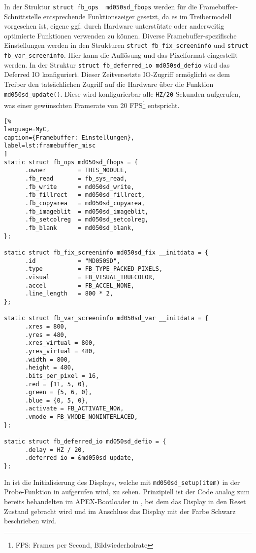 In der Struktur \lstinline|struct fb_ops  md050sd_fbops| werden für die Framebuffer-Schnittstelle entsprechende Funktionszeiger gesetzt, da es im Treibermodell vorgesehen ist, eigene ggf. durch Hardware unterstützte oder anderweitig optimierte Funktionen verwenden zu können. Diverse Framebuffer-spezifische Einstellungen werden in den Strukturen \lstinline|struct fb_fix_screeninfo| und \lstinline|struct fb_var_screeninfo|. Hier kann die Auflösung und das Pixelformat eingestellt werden. 
In der Struktur \lstinline|struct fb_deferred_io md050sd_defio| wird das Deferred IO konfiguriert. Dieser Zeitversetzte IO-Zugriff ermöglicht es dem Treiber den tatsächlichen Zugriff auf die Hardware über die Funktion \lstinline|md050sd_update()|. Diese wird konfigurierbar alle \lstinline|HZ/20| Sekunden aufgerufen, was einer gewünschten Framerate von 20 FPS\footnote{FPS: Frames per Second, Bildwiederholrate} entspricht. 
\begin{lstlisting}[%
language=MyC,
caption={Framebuffer: Einstellungen},
label=lst:framebuffer_misc
]
static struct fb_ops md050sd_fbops = {
      .owner         = THIS_MODULE,
      .fb_read       = fb_sys_read,
      .fb_write      = md050sd_write,
      .fb_fillrect   = md050sd_fillrect,
      .fb_copyarea   = md050sd_copyarea,
      .fb_imageblit  = md050sd_imageblit,
      .fb_setcolreg  = md050sd_setcolreg,
      .fb_blank      = md050sd_blank,
};

static struct fb_fix_screeninfo md050sd_fix __initdata = {
      .id            = "MD050SD",
      .type          = FB_TYPE_PACKED_PIXELS,
      .visual        = FB_VISUAL_TRUECOLOR,
      .accel         = FB_ACCEL_NONE,
      .line_length   = 800 * 2,
};

static struct fb_var_screeninfo md050sd_var __initdata = {
      .xres = 800,
      .yres = 480,
      .xres_virtual = 800,
      .yres_virtual = 480,
      .width = 800,
      .height = 480,
      .bits_per_pixel = 16,
      .red = {11, 5, 0},
      .green = {5, 6, 0},
      .blue = {0, 5, 0},
      .activate = FB_ACTIVATE_NOW,
      .vmode = FB_VMODE_NONINTERLACED,
};

static struct fb_deferred_io md050sd_defio = {
      .delay = HZ / 20,
      .deferred_io = &md050sd_update,
};
\end{lstlisting}

In  ist die Initialisierung des Displays, welche mit \lstinline|md050sd_setup(item)| in der Probe-Funktion in  aufgerufen wird, zu sehen. Prinzipiell ist der Code analog zum bereits behandelten im APEX-Bootloader in , bei dem das Display in den Reset Zustand gebracht wird und im Anschluss das Display mit der Farbe Schwarz beschrieben wird.

